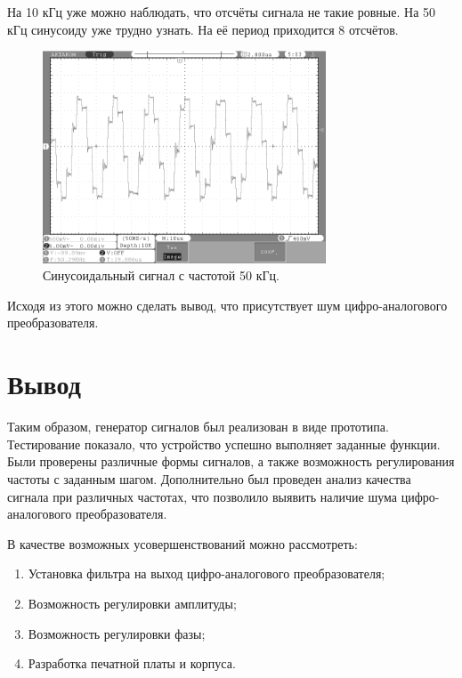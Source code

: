 	На 10 кГц уже можно наблюдать, что отсчёты сигнала не такие ровные. На 50 кГц синусоиду уже трудно узнать. На её период приходится 8 отсчётов.
	
	\begin{figure}[H]
    \centering
    \includegraphics[width=0.75\textwidth]{../image/sin50.bmp}
    \caption{Синусоидальный сигнал с частотой 50 кГц.}
	\end{figure}	
	
	Исходя из этого можно сделать вывод, что присутствует шум цифро-аналогового преобразователя. 

\section{Вывод}
	Таким образом, генератор сигналов был реализован в виде прототипа. Тестирование показало, что устройство успешно выполняет заданные функции. Были проверены различные формы сигналов, а также возможность регулирования частоты с заданным шагом. Дополнительно был проведен анализ качества сигнала при различных частотах, что позволило выявить наличие шума цифро-аналогового преобразователя. 
	
	В качестве возможных усовершенствований можно рассмотреть:
	\begin{enumerate}
	\item Установка фильтра на выход цифро-аналогового преобразователя;
	\item Возможность регулировки амплитуды;
	\item Возможность регулировки фазы;
	\item Разработка печатной платы и корпуса.
	\end{enumerate}